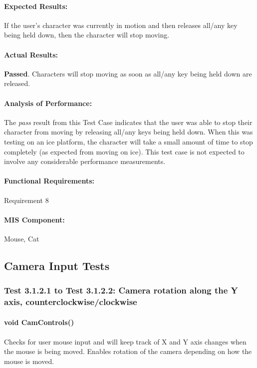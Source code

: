 \documentclass{article}
\begin{document}
    \paragraph{Expected Results:} If the user's character was currently in motion and then releases all/any key being held down, then the character will stop moving.
    \paragraph{Actual Results:} \textbf{Passed}. Characters will stop moving as soon as all/any key being held down are released. 
    \paragraph{Analysis of Performance:} The \emph{pass} result from this Test Case indicates that the user was able to stop their character from moving by releasing all/any keys being held down. When this was testing on an ice platform, the character will take a small amount of time to stop completely (as expected from moving on ice). This test case is not expected to involve any considerable performance measurements.
    \paragraph{Functional Requirements:} Requirement 8
    \paragraph{MIS Component:} Mouse, Cat 
    
    \subsection{Camera Input Tests}
    
    \subsubsection{Test 3.1.2.1 to Test 3.1.2.2: Camera rotation along the Y axis, counterclockwise/clockwise}
    \paragraph{}\textbf{void CamControls()}
    \paragraph{} Checks for user mouse input and will keep track of X and Y axis changes when the mouse is being moved. Enables rotation of the camera depending on how the mouse is moved.
\end{document}
